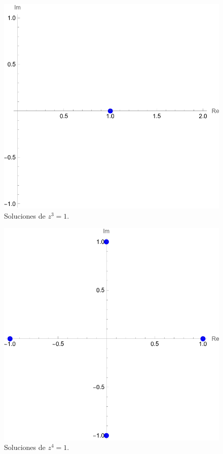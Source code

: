 \documentclass[conference]{IEEEtran}
\begin{document}
\begin{figure}[H]
	\centering
	\includegraphics[scale=0.4]{./img/p14-4_d}
	\caption{Soluciones de $z^3 = 1$.}
\end{figure}


\begin{figure}[H]
	\centering
	\includegraphics[scale=0.4]{./img/p14-4_e}
	\caption{Soluciones de $z^4 = 1$.}
\end{figure}
\end{document}
